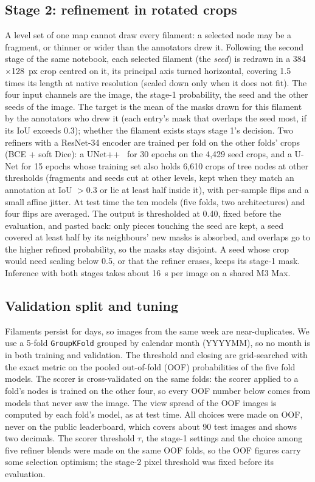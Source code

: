 \documentclass[sigconf]{acmart}
\begin{document}
\subsection{Stage 2: refinement in rotated crops}
A level set of one map cannot draw every filament: a selected node may be a fragment, or thinner or wider than the annotators drew it. Following the second stage of the same notebook, each selected filament (the \emph{seed}) is redrawn in a 384$\times$128~px crop centred on it, its principal axis turned horizontal, covering 1.5 times its length at native resolution (scaled down only when it does not fit). The four input channels are the image, the stage-1 probability, the seed and the other seeds of the image. The target is the mean of the masks drawn for this filament by the annotators who drew it (each entry's mask that overlaps the seed most, if its IoU exceeds 0.3); whether the filament exists stays stage 1's decision. Two refiners with a ResNet-34 encoder are trained per fold on the other folds' crops (BCE + soft Dice): a UNet++~\cite{unetpp} for 30 epochs on the 4{,}429 seed crops, and a U-Net for 15 epochs whose training set also holds 6{,}610 crops of tree nodes at other thresholds (fragments and seeds cut at other levels, kept when they match an annotation at IoU $>0.3$ or lie at least half inside it), with per-sample flips and a small affine jitter. At test time the ten models (five folds, two architectures) and four flips are averaged. The output is thresholded at 0.40, fixed before the evaluation, and pasted back: only pieces touching the seed are kept, a seed covered at least half by its neighbours' new masks is absorbed, and overlaps go to the higher refined probability, so the masks stay disjoint. A seed whose crop would need scaling below 0.5, or that the refiner erases, keeps its stage-1 mask. Inference with both stages takes about 16~s per image on a shared M3 Max.

\subsection{Validation split and tuning}
Filaments persist for days, so images from the same week are near-duplicates. We use a 5-fold \texttt{GroupKFold} grouped by calendar month (YYYYMM), so no month is in both training and validation. The threshold and closing are grid-searched with the exact metric on the pooled out-of-fold (OOF) probabilities of the five fold models. The scorer is cross-validated on the same folds: the scorer applied to a fold's nodes is trained on the other four, so every OOF number below comes from models that never saw the image. The view spread of the OOF images is computed by each fold's model, as at test time. All choices were made on OOF, never on the public leaderboard, which covers about 90 test images and shows two decimals. The scorer threshold $\tau$, the stage-1 settings and the choice among five refiner blends were made on the same OOF folds, so the OOF figures carry some selection optimism; the stage-2 pixel threshold was fixed before its evaluation.
\end{document}
